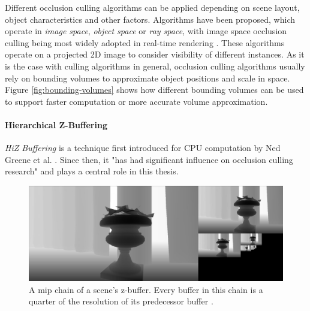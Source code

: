 \noindent
Different occlusion culling algorithms can be applied depending on scene layout, object characteristics and other 
factors. Algorithms have been proposed, which operate in \emph{image space}, \emph{object space} or \emph{ray space}, 
with image space occlusion culling being most widely adopted in real-time rendering \cite{AkenineMoeller2018}. 
These algorithms operate on a projected 2D image to consider visibility of different instances. As it is the case 
with culling algorithms in general, occlusion culling algorithms usually rely on bounding volumes to approximate 
object positions and scale in space. Figure \ref{fig:bounding-volumes} shows how different bounding volumes can be 
used to support faster computation or more accurate volume approximation.


\paragraph*{Hierarchical Z-Buffering} \label{subsubsec-hierarchical-z-buffering}

\emph{\ac{HiZ} Buffering} is a technique first introduced for \ac{CPU} computation by Ned Greene et al. 
\cite{Greene93,Greene95}. Since then, it "has had significant influence on occlusion culling research" 
\cite{AkenineMoeller2018} and plays a central role in this thesis. \\

\begin{figure}[h]
    \centering
    \includegraphics[width=\linewidth]{images/graphics/hiz-mip-chain.jpg}
    \caption{A mip chain of a scene's z-buffer. Every buffer in this chain is a quarter of the resolution of its 
    predecessor buffer \cite{Schachtschabel2017}.}
    \label{fig:hiz-mip-chain}
\end{figure}


